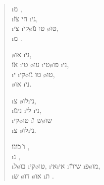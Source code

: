 \begin{verse}
	  \i{מ} ,\\
	\i{חי}  \u{צו} \i{גי},\\
	\i{צי} \i{קי}\o{טו} \u{נו} \o{טו},\\
	  \i{מ} .

	\o{או}  \i{ני},\\
	\u{או} \i{טי} \o{עו} \i{טי}\o{פו} \i{ני},\\
	\i{י} \i{קי}\o{טו} \u{נו} \o{טו},\\
	 \o{או}  \i{ני}.

	  \i{צ} \o{לו}\i{ני},\\
	 \i{ני}\u{גו} \i{לי}  \i{ני},\\
	\i{קי}\o{טו} \i{ש} \u{ו}\o{שו}\\
	  \i{צ} \o{לו}\i{ני}.

	\u{ו}  \u{כו}\u{נו}  ,\\
	\i{נ}    ,\\
	\i{ל}\o{בו} \i{קי}\o{טו}, \i{אי}\i{אי}  \i{שי}\u{רו}  \i{פ}\o{מו},\\
	\i{ש} \o{דו} \o{או} \i{ת} .
\end{verse}
